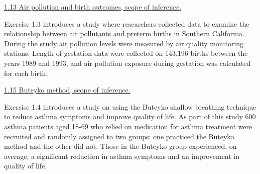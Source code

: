 \documentclass[10pt,letterpaper,unboxed,cm]{exam}
\begin{document}
\begin{questions}
	\question \underline{1.13 Air pollution and birth outcomes, scope of inference.}

    Exercise 1.3 introduces a study where researchers collected data to examine the relationship between air pollutants and preterm births in Southern California. During the study air pollution levels were measured by air quality monitoring stations. Length of gestation data were collected on 143,196 births between the years 1989 and 1993, and air pollution exposure during gestation was calculated for each birth.
    



	\question \underline{1.15 Buteyko method, scope of inference.}

    Exercise 1.4 introduces a study on using the Buteyko shallow breathing technique to reduce asthma symptoms and improve quality of life. As part of this study 600 asthma patients aged 18-69 who relied on medication for asthma treatment were recruited and randomly assigned to two groups: one practiced the Buteyko method and the other did not. Those in the Buteyko group experienced, on average, a significant reduction in asthma symptoms and an improvement in quality of life.
    

\end{questions}
\end{document}
